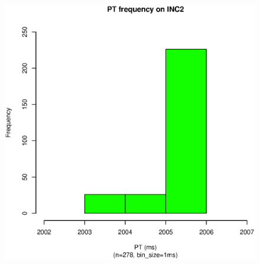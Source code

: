 \begin{figure}[hp!]
{		\includegraphics[scale=0.43]{sodb9/2_sec_pt_hist_v5.eps}
		\label{fig:inc2_hist_v5}
	}
\end{figure}
